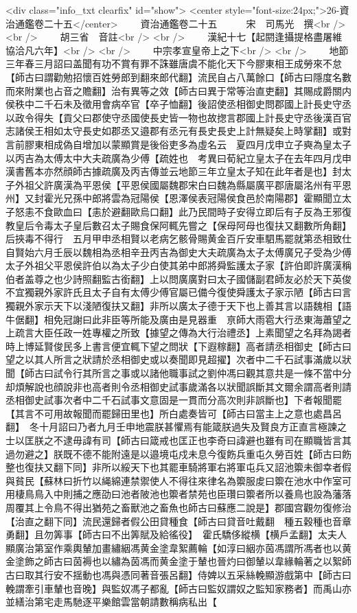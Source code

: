 <div class="info_txt clearfix" id="show">
<center style="font-size:24px;">26-資治通鑑卷二十五</center>
  　　資治通鑑卷二十五　　　宋　司馬光　撰<br />
<br />
　　胡三省　音註<br />
<br />
　　漢紀十七【起閼逢攝提格盡屠維協洽凡六年】<br />
<br />
　　中宗孝宣皇帝上之下<br />
<br />
　　地節三年春三月詔曰盖聞有功不賞有罪不誅雖唐虞不能化天下今膠東相王成勞來不怠【師古曰謂勸勉招懷百姓勞郎到翻來郎代翻】流民自占八萬餘口【師古曰隱度名數而來附業也占音之贍翻】治有異等之效【師古曰異于常等治直吏翻】其賜成爵關内侯秩中二千石未及徵用會病卒官【卒子恤翻】後詔使丞相御史問郡國上計長史守丞以政令得失【貢父曰郡使守丞國使長史皆一物也故揔言郡國上計長史守丞後漢百官志諸侯王相如太守長史如郡丞又邉郡有丞元有長史長史上計無疑矣上時掌翻】或對言前膠東相成偽自增加以蒙顯賞是後俗吏多為虛名云　夏四月戊申立子奭為皇太子以丙吉為太傅太中大夫疏廣為少傅【疏姓也　考異曰荀紀立皇太子在去年四月戊申漢書舊本亦然顔師古據疏廣及丙吉傳並云地節三年立皇太子知在此年者是也】封太子外祖父許廣漢為平恩侯【平恩侯國屬魏郡宋白曰魏為縣屬廣平郡唐屬洺州有平恩州】又封霍光兄孫中郎將雲為冠陽侯【恩澤侯表冠陽侯食邑於南陽郡】霍顯聞立太子怒恚不食歐血曰【恚於避翻歐烏口翻】此乃民間時子安得立即后有子反為王邪復教皇后令毒太子皇后數召太子賜食保阿輒先嘗之【保母阿母也復扶又翻數所角翻】后挾毒不得行　五月甲申丞相賢以老病乞骸骨賜黄金百斤安車駟馬罷就第丞相致仕自賢始六月壬辰以魏相為丞相辛丑丙吉為御史大夫疏廣為太子太傅廣兄子受為少傅太子外祖父平恩侯許伯以為太子少白使其弟中郎將舜監護太子家【許伯即許廣漢稱伯者盖尊之也少詩照翻監古銜翻】上以問廣廣對曰太子國儲副君師友必於天下英俊不宜獨親外家許氏且太子自有太傅少傅官屬已備今復使舜護太子家示陋【師古曰言獨親外家示天下以淺陋復扶又翻】非所以廣太子德于天下也上善其言以語魏相【語牛倨翻】相免冠謝曰此非臣等所能及廣由是見器重　亰師大雨雹大行丞東海蕭望之上疏言大臣任政一姓專權之所致【據望之傳為大行治禮丞】上素聞望之名拜為謁者時上博延賢俊民多上書言便宜輒下望之問狀【下遐稼翻】高者請丞相御史【師古曰望之以其人所言之狀請於丞相御史或以奏聞即見超擢】次者中二千石試事滿歲以狀聞【師古曰試令行其所言之事或以諸他職事試之劉仲馮曰觀其意共是一條不當中分却煩解說也顔說非也高者則令丞相御史試事歲滿各以狀聞誤斷其文爾余謂高者則請丞相御史試事次者中二千石試事文意固是一貫而分高次則非誤斷也】下者報聞罷【其言不可用故報聞而罷歸田里也】所白處奏皆可【師古曰當主上之意也處昌呂翻】　冬十月詔曰乃者九月壬申地震朕甚懼焉有能箴朕過失及賢良方正直言極諫之士以匡朕之不逮毋諱有司【師古曰箴戒也匡正也李奇曰諱避也雖有司在顯職皆言其過勿避之】朕既不德不能附遠是以邉境屯戍未息今復飭兵重屯久勞百姓【師古曰飭整也復扶又翻下同】非所以綏天下也其罷車騎將軍右將軍屯兵又詔池籞未御幸者假與貧民【蘇林曰折竹以䋲綿連禁禦使人不得往來律名為籞服䖍曰籞在池水中作室可用棲鳥鳥入中則捕之應劭曰池者陂池也籞者禁苑也臣瓚曰籞者所以養鳥也設為藩落周覆其上令鳥不得出猶苑之畜獸池之畜魚也師古曰蘇應二說是】郡國宫觀勿復修治【治直之翻下同】流民還歸者假公田貸種食【師古曰貸音吐戴翻　種五穀種也音章勇翻】且勿筭事【師古曰不出筭賦及給徭役】　霍氏驕侈縱横【横戶孟翻】太夫人顯廣治第室作乘輿輦加畫繡絪馮黄金塗韋絮薦輪【如淳曰絪亦茵馮謂所馮者也以黄金塗飾之師古曰茵褥也以繡為茵馮而黄金塗于輦也晉灼曰御輦以韋緣輪著之以絮師古曰取其行安不揺動也馮與憑同著音張呂翻】侍婢以五采絲輓顯游戲第中【師古曰輓謂牽引車輦也音晚】與監奴馮子都亂【師古曰監奴謂奴之監知家務者】而禹山亦並繕治第宅走馬馳逐平樂館雲當朝請數稱病私出【